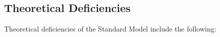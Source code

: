 \begin{itemize}

\end{itemize}

\subsection{Theoretical Deficiencies}\label{sec:bsm-theoretical-deficiencies}
Theoretical deficiencies of the Standard Model include the following:

